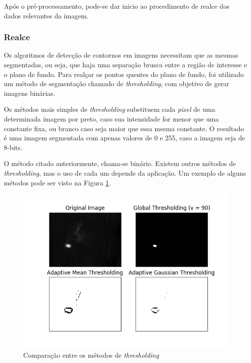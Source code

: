 		Após o pré-processamento, pode-se dar inicio ao procedimento de realce dos dados relevantes da imagem.
		
		\subsubsection{Realce}
		
		Os algoritmos de detecção de contornos em imagens necessitam que as mesmas segmentadas, ou seja, que haja uma separação brusca entre a região de interesse e o plano de fundo. Para realçar os pontos quentes do plano de fundo, foi utilizado um método de segmentação chamado de \textit{thresholding}, com objetivo de gerar imagens binárias.
		
		Os métodos mais simples de \textit{thresholding} substituem cada \textit{pixel} de uma determinada imagem por preto, caso sua intensidade for menor que uma constante fixa, ou branco caso seja maior que essa mesma constante. O resultado é uma imagem segmentada com apenas valores de 0 e 255, caso a imagem seja de 8-bits.
		
		O método citado anteriormente, chama-se binário. Existem outros métodos de \textit{thresholding}, mas o uso de cada um depende da aplicação. Um exemplo de alguns métodos pode ser visto na Figura \ref{fig:thresh}.
		
		\begin{figure}[!ht]
		   \centering
		   \includegraphics[width=16cm]{Figures/thresh.png}
		   \caption{Comparação entre os métodos de \textit{thresholding}}
		   \label{fig:thresh}
		\end{figure}
		
